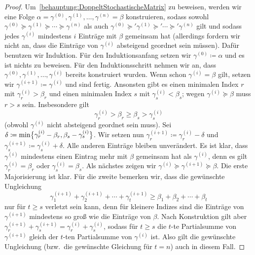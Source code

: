 \begin{proof}
	Um~\ref{behauptung:DoppeltStochastischeMatrix} zu beweisen, werden wir eine Folge $\alpha=\gamma^{(0)},\gamma^{(1)},\dotsc,\gamma^{(n)}=\beta$ konstruieren, sodass sowohl $\gamma^{(0)}\succcurlyeq\gamma^{(1)}\succcurlyeq\dotsb\succcurlyeq\gamma^{(n)}$ als auch $\gamma^{(0)}\succcurlyeq'\gamma^{(1)}\succcurlyeq'\dotsb\succcurlyeq'\gamma^{(n)}$ gilt und sodass jedes $\gamma^{(i)}$ mindestens $i$ Einträge mit $\beta$ gemeinsam hat (allerdings fordern wir nicht an, dass die Einträge von $\gamma^{(i)}$ absteigend geordnet sein müssen). Dafür benutzen wir Induktion. Für den Induktionsanfang setzen wir $\gamma^{(0)}\coloneqq \alpha$ und es ist nichts zu beweisen. Für den Induktionsschritt nehmen wir an, dass $\gamma^{(0)},\gamma^{(1)},\dotsc,\gamma^{(i)}$ bereits konstruiert wurden. Wenn schon $\gamma^{(i)}=\beta$ gilt, setzen wir $\gamma^{(i+1)}\coloneqq \gamma^{(i)}$ und sind fertig. Ansonsten gibt es einen minimalen Index $r$ mit $\gamma_r^{(i)}>\beta_r$ und einen minimalen Index $s$ mit $\gamma_s^{(i)}<\beta_s$; wegen $\gamma^{(i)}\succcurlyeq \beta$ muss $r>s$ sein. Insbesondere gilt
	\begin{equation*}
		\gamma_r^{(i)}>\beta_r\geqslant \beta_s>\gamma_s^{(i)}
	\end{equation*}
	(obwohl $\gamma^{(i)}$ nicht absteigend geordnet sein muss). Sei $\delta\coloneqq \min\braces[\big]{\gamma_r^{(i)}-\beta_r,\beta_s-\gamma_s^{(i)}}$. Wir setzen nun $\gamma_r^{(i+1)}\coloneqq \gamma_r^{(i)}-\delta$ und $\gamma_s^{(i+1)}\coloneqq \gamma_s^{(i)}+\delta$. Alle anderen Einträge bleiben unverändert. Es ist klar, dass $\gamma^{(i)}$ mindestens einen Eintrag mehr mit $\beta$ gemeinsam hat als $\gamma^{(i)}$, denn es gilt $\gamma_r^{(i)}=\beta_r$ oder $\gamma_s^{(i)}=\beta_s$. Als nächstes zeigen wir $\gamma^{(i)}\succcurlyeq \gamma^{(i+1)}\succcurlyeq \beta$. Die erste Majorisierung ist klar. Für die zweite bemerken wir, dass die gewünschte Ungleichung
	\begin{equation*}
			\gamma_1^{(i+1)}+\gamma_2^{(i+1)}+\dotsb+\gamma_t^{(i+1)}\geqslant \beta_1+\beta_2+\dotsb+\beta_t
	\end{equation*}
	nur für $t\geqslant s$ verletzt sein kann, denn für kleinere Indizes sind die Einträge von $\gamma^{(i+1)}$ mindestens so groß wie die Einträge von $\beta$. Nach Konstruktion gilt aber $\gamma_r^{(i+1)}+\gamma_s^{(i+1)}=\gamma_r^{(i)}+\gamma_s^{(i)}$, sodass für $t\geqslant s$ die $t$-te Partialsumme von $\gamma^{(i+1)}$ gleich der $t$-ten Partialsumme von $\gamma^{(i)}$ ist. Also gilt die gewünschte Ungleichung (bzw.\ die gewünschte Gleichung für $t=n$) auch in diesem Fall.
	

\end{proof}
